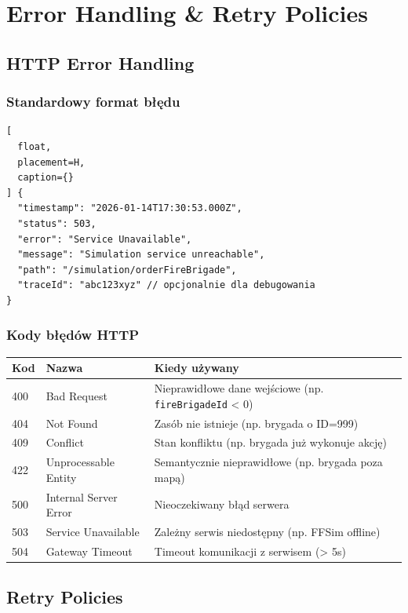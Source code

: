 \documentclass[11pt,a4paper] {article}
\begin{document}
\section{Error Handling \& Retry Policies}

\subsection{HTTP Error Handling}

\subsubsection{Standardowy format błędu}

\begin{lstlisting}[
  float,
  placement=H,
  caption={}
] {
  "timestamp": "2026-01-14T17:30:53.000Z",
  "status": 503,
  "error": "Service Unavailable",
  "message": "Simulation service unreachable",
  "path": "/simulation/orderFireBrigade",
  "traceId": "abc123xyz" // opcjonalnie dla debugowania
}
\end{lstlisting}

\subsubsection{Kody błędów HTTP}

\begin{longtable}{|l|l|p{6cm}|}
\hline
\textbf{Kod} & \textbf{Nazwa} & \textbf{Kiedy używany} \\
\hline
400 & Bad Request & Nieprawidłowe dane wejściowe (np. \texttt{fireBrigadeId} < 0) \\
\hline
404 & Not Found & Zasób nie istnieje (np. brygada o ID=999) \\
\hline
409 & Conflict & Stan konfliktu (np. brygada już wykonuje akcję) \\
\hline
422 & Unprocessable Entity & Semantycznie nieprawidłowe (np. brygada poza mapą) \\
\hline
500 & Internal Server Error & Nieoczekiwany błąd serwera \\
\hline
503 & Service Unavailable & Zależny serwis niedostępny (np. FFSim offline) \\
\hline
504 & Gateway Timeout & Timeout komunikacji z serwisem (> 5s) \\
\hline
\end{longtable}

\subsection{Retry Policies}
\end{document}
